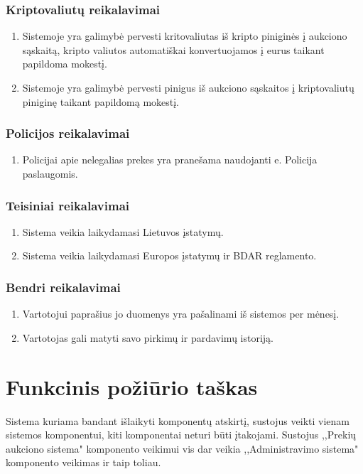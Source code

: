 \documentclass{VUMIFPSmagistrinis}
\begin{document}
				\subsubsection{Kriptovaliutų reikalavimai}
					\begin{enumerate}
						\item{Sistemoje yra galimybė pervesti kritovaliutas iš kripto piniginės į aukciono sąskaitą, kripto valiutos automatiškai konvertuojamos į eurus taikant papildoma mokestį. }
						\item{Sistemoje yra galimybė pervesti pinigus iš aukciono sąskaitos į kriptovaliutų piniginę taikant papildomą mokestį.}
					\end{enumerate}
				\subsubsection{Policijos reikalavimai}
					\begin{enumerate}
						\item{Policijai apie nelegalias prekes yra pranešama naudojanti e. Policija paslaugomis.}
					\end{enumerate}
				\subsubsection{Teisiniai reikalavimai}
					\begin{enumerate}
						\item{Sistema veikia laikydamasi Lietuvos įstatymų.}
						\item{Sistema veikia laikydamasi Europos įstatymų ir BDAR reglamento.}
					\end{enumerate}
				\subsubsection{Bendri reikalavimai}
					\begin{enumerate}
						\item{Vartotojui paprašius jo duomenys yra pašalinami iš sistemos per mėnesį.}
						\item{Vartotojas gali matyti savo pirkimų ir pardavimų istoriją.}	
					\end{enumerate}
			
		\section{Funkcinis požiūrio taškas}
			Sistema kuriama bandant išlaikyti komponentų atskirtį, sustojus veikti vienam sistemos komponentui, kiti komponentai neturi būti įtakojami.
			Sustojus ,,Prekių aukciono sistema" komponento veikimui vis dar veikia ,,Administravimo sistema" komponento veikimas ir taip toliau.
\end{document}
